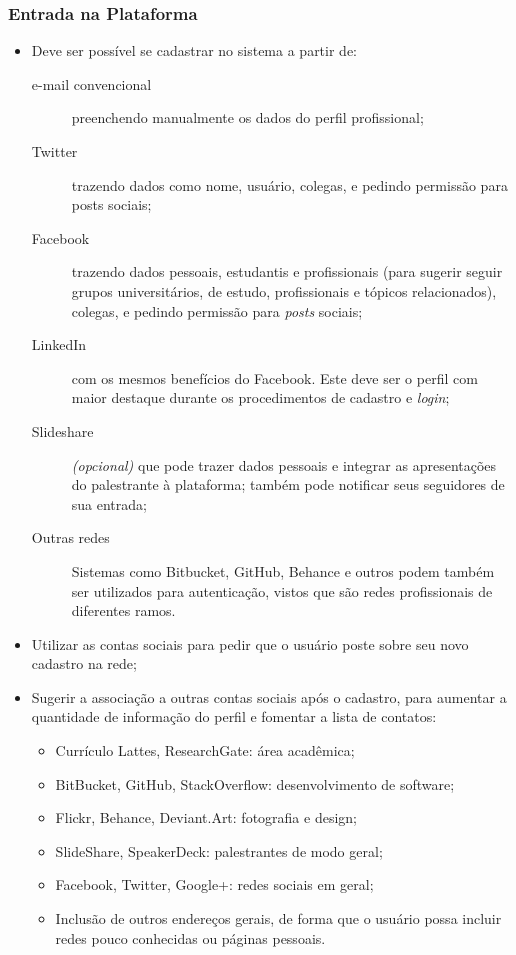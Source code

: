 \documentclass[12pt,a4paper,twoside,hyphens,english,brazil]{abntex2}
\begin{document}
\subsubsection*{Entrada na Plataforma}
\begin{itemize}
\item Deve ser possível se cadastrar no sistema a partir de:
	\begin{description} %
		\item[e-mail convencional] preenchendo manualmente os dados do perfil profissional;
		\item[Twitter] trazendo dados como nome, usuário, colegas, e pedindo permissão para posts sociais; %
		\item[Facebook] trazendo dados pessoais, estudantis e profissionais (para sugerir seguir grupos universitários, de estudo, profissionais e tópicos relacionados), colegas, e pedindo permissão para \emph{posts} sociais; %
		\item[LinkedIn] com os mesmos benefícios do Facebook. Este deve ser o perfil com maior destaque durante os procedimentos de cadastro e \emph{login};
		\item[Slideshare] \textit{(opcional)} que pode trazer dados pessoais e integrar as apresentações do palestrante à plataforma; também pode notificar seus seguidores de sua entrada;
		\item[Outras redes] Sistemas como Bitbucket, GitHub, Behance e outros podem também ser utilizados para autenticação, vistos que são redes profissionais de diferentes ramos.
	\end{description}
\item Utilizar as contas sociais para pedir que o usuário poste sobre seu novo cadastro na rede;
\item Sugerir a associação a outras contas sociais após o cadastro, para aumentar a quantidade de informação do perfil e fomentar a lista de contatos:
	\begin{itemize}[itemsep=-1ex]
		\item Currículo Lattes, ResearchGate: área acadêmica;
		\item BitBucket, GitHub, StackOverflow: desenvolvimento de software;
		\item Flickr, Behance, Deviant.Art: fotografia e design;
		\item SlideShare, SpeakerDeck: palestrantes de modo geral;
		\item Facebook, Twitter, Google+: redes sociais em geral;
		\item Inclusão de outros endereços gerais, de forma que o usuário possa incluir redes pouco conhecidas ou páginas pessoais.
	\end{itemize}
\end{itemize}
\end{document}
